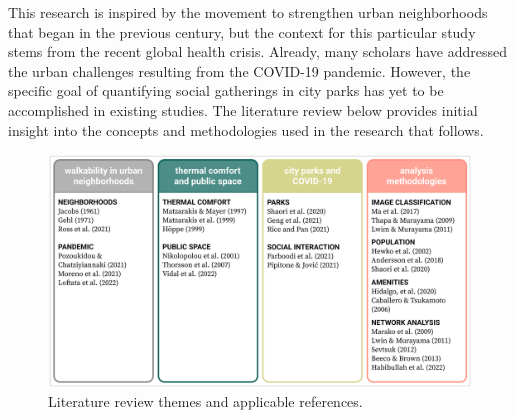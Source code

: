 \noindent This research is inspired by the movement to strengthen urban neighborhoods that began in the previous century, but the context for this particular study stems from the recent global health crisis. Already, many scholars have addressed the urban challenges resulting from the COVID-19 pandemic. However, the specific goal of quantifying social gatherings in city parks has yet to be accomplished in existing studies. The literature review below provides initial insight into the concepts and methodologies used in the research that follows.\\

\begin{figure}[h]
  \centering
  \includegraphics[width=1.0\textwidth]{images/literature/theory.png}
  \captionsetup{width=1.0\linewidth}
  \caption[Literature review]{Literature review themes and applicable references.}
  \label{fig:literature}
\end{figure}

